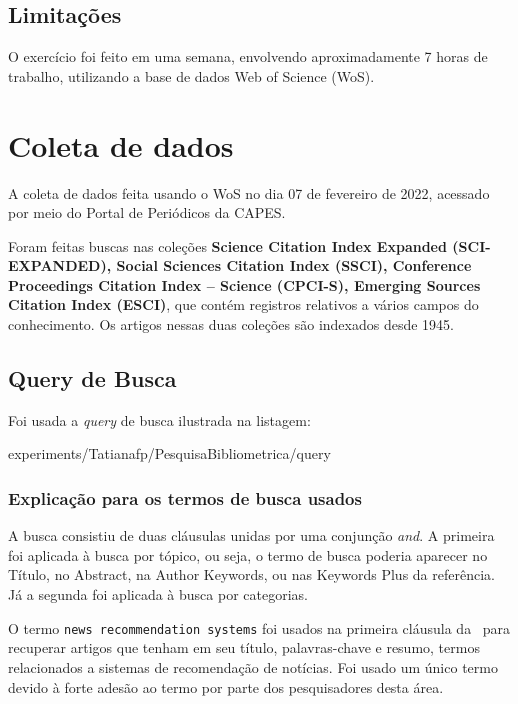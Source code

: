 \subsection{Limitações} 

O exercício foi feito em uma semana, envolvendo aproximadamente 7 horas de trabalho, utilizando a base de dados Web of Science (WoS).

\section{Coleta de dados}

A coleta de dados feita usando o WoS no dia 07 de fevereiro de 2022, acessado por meio do Portal de Periódicos da CAPES.

Foram feitas buscas nas coleções \textbf{Science Citation Index Expanded (SCI-EXPANDED), Social Sciences Citation Index (SSCI), Conference Proceedings Citation Index – Science (CPCI-S), Emerging Sources Citation Index (ESCI)}, que contém registros relativos a vários campos do conhecimento. Os artigos nessas duas coleções são indexados desde 1945. 

\subsection{Query de Busca}

Foi usada a \textit{query} de busca ilustrada na listagem:


{experiments/Tatianafp/PesquisaBibliometrica/query}

\subsubsection{Explicação para os termos de busca usados}

A busca consistiu de duas cláusulas unidas por uma conjunção \textit{and}. A primeira foi aplicada à busca por tópico, ou seja, o termo de busca poderia aparecer no Título, no Abstract, na Author Keywords, ou nas Keywords Plus da referência. Já a segunda foi aplicada à busca por categorias. 

O termo \texttt{news recommendation systems} foi usados na primeira cláusula da \query\  para recuperar artigos que tenham em seu título, palavras-chave e resumo, termos relacionados a sistemas de recomendação de notícias. Foi usado um único termo devido à forte adesão ao termo por parte dos pesquisadores desta área.

